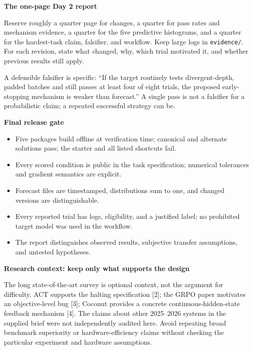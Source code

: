 \documentclass[11pt,a4paper]{article}
\newcommand{\sub}[1]{\vspace{4pt}\textbf{#1}\par}
\newcommand{\code}[1]{\texttt{#1}}
\begin{document}
\sub{The one-page Day 2 report}
Reserve roughly a quarter page for changes, a quarter for pass rates and mechanism evidence, a quarter for the five predictive histograms, and a quarter for the hardest-task claim, falsifier, and workflow. Keep large logs in \code{evidence/}. For each revision, state what changed, why, which trial motivated it, and whether previous results still apply.

A defensible falsifier is specific: ``If the target routinely tests divergent-depth, padded batches and still passes at least four of eight trials, the proposed early-stopping mechanism is weaker than forecast.'' A single pass is not a falsifier for a probabilistic claim; a repeated successful strategy can be.

\sub{Final release gate}
\begin{itemize}
\item Five packages build offline at verification time; canonical and alternate solutions pass; the starter and all listed shortcuts fail.
\item Every scored condition is public in the task specification; numerical tolerances and gradient semantics are explicit.
\item Forecast files are timestamped, distributions sum to one, and changed versions are distinguishable.
\item Every reported trial has logs, eligibility, and a justified label; no prohibited target model was used in the workflow.
\item The report distinguishes observed results, subjective transfer assumptions, and untested hypotheses.
\end{itemize}

\sub{Research context: keep only what supports the design}
The long state-of-the-art survey is optional context, not the argument for difficulty. ACT supports the halting specification [2]; the GRPO paper motivates an objective-level bug [3]; Coconut provides a concrete continuous-hidden-state feedback mechanism [4]. The claims about other 2025--2026 systems in the supplied brief were not independently audited here. Avoid repeating broad benchmark superiority or hardware-efficiency claims without checking the particular experiment and hardware assumptions.
\end{document}
